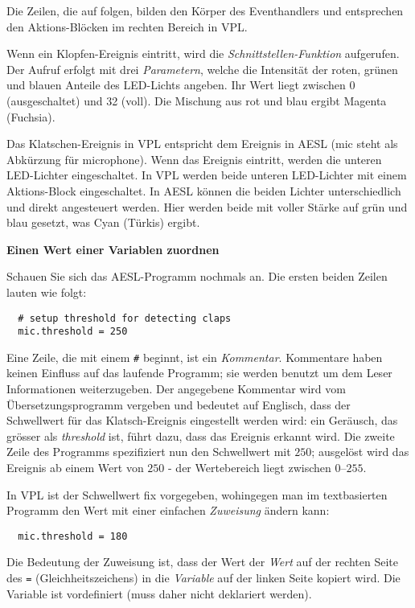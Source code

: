 Die Zeilen, die auf  folgen, bilden den Körper des Eventhandlers und entsprechen den Aktions-Blöcken im rechten Bereich in VPL.

Wenn ein Klopfen-Ereignis eintritt, wird die \emph{Schnittstellen-Funktion}  aufgerufen. Der Aufruf erfolgt mit drei \emph{Parametern}, welche die Intensität der roten, grünen und blauen Anteile des LED-Lichts angeben. Ihr Wert liegt zwischen 0 (ausgeschaltet) und 32 (voll). Die Mischung aus rot und blau ergibt Magenta (Fuchsia). 

Das Klatschen-Ereignis in VPL entspricht dem   Ereignis in AESL (mic steht als Abkürzung für microphone). Wenn das Ereignis eintritt, werden die unteren LED-Lichter eingeschaltet. In VPL werden beide unteren LED-Lichter mit einem Aktions-Block eingeschaltet. In AESL können die beiden Lichter unterschiedlich und direkt angesteuert werden. Hier werden beide mit voller Stärke auf grün und blau gesetzt, was Cyan (Türkis) ergibt. 

\textbf{\large Einen Wert einer Variablen zuordnen}

Schauen Sie sich das AESL-Programm nochmals an. Die ersten beiden Zeilen lauten wie folgt: 
\begin{footnotesize}
\begin{verbatim}
  # setup threshold for detecting claps
  mic.threshold = 250
\end{verbatim}
\end{footnotesize}

Eine Zeile, die mit einem \verb+#+ beginnt, ist ein \emph{Kommentar}. Kommentare haben keinen Einfluss auf das laufende Programm; sie werden benutzt um dem Leser Informationen weiterzugeben. Der angegebene Kommentar wird vom Übersetzungsprogramm vergeben und bedeutet auf Englisch, dass der Schwellwert für das Klatsch-Ereignis eingestellt werden wird: ein Geräusch, das grösser als \emph{threshold} ist, führt dazu, dass das Ereignis erkannt wird. Die zweite Zeile des Programms spezifiziert nun den Schwellwert mit $250$; ausgelöst wird das Ereignis ab einem Wert von $250$ - der Wertebereich liegt zwischen $0$--$255$.

In VPL ist der Schwellwert fix vorgegeben, wohingegen man im textbasierten Programm den Wert mit einer einfachen \emph{Zuweisung} ändern kann: 
\begin{footnotesize}
\begin{verbatim}
  mic.threshold = 180
\end{verbatim}
\end{footnotesize}
Die Bedeutung der Zuweisung ist, dass der Wert der \emph{Wert} auf der rechten Seite des \verb+=+ (Gleichheitszeichens) in die \emph{Variable} auf der linken Seite kopiert wird. Die Variable  ist vordefiniert (muss daher nicht deklariert werden).


